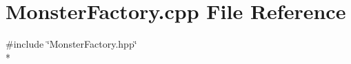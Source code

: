 \section{Monster\-Factory.\-cpp File Reference}
\label{_monster_factory_8cpp}
{\ttfamily \#include \char`\"{}Monster\-Factory.\-hpp\char`\"{}}\\*
